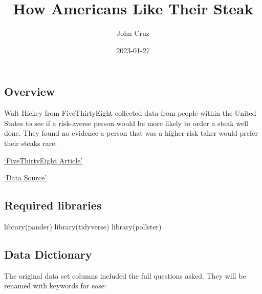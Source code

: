 \documentclass[
]{article}
\title{How Americans Like Their Steak}
\author{John Cruz}
\date{2023-01-27}
\newenvironment{Shaded}{\begin{snugshade}}{\end{snugshade}}
\newcommand{\FunctionTok}[1]{\textcolor[rgb]{0.00,0.00,0.00}{#1}}
\newcommand{\NormalTok}[1]{#1}
\begin{document}
\maketitle

\hypertarget{overview}{%
\subsection{Overview}\label{overview}}

Walt Hickey from FiveThirtyEight collected data from people within the
United States to see if a risk-averse person would be more likely to
order a steak well done. They found no evidence a person that was a
higher risk taker would prefer their steaks rare.

\href{\textquotesingle{}https://fivethirtyeight.com/features/how-americans-like-their-steak/\textquotesingle{}}{`FiveThirtyEight
Article'}

\href{\textquotesingle{}https://raw.githubusercontent.com/fivethirtyeight/data/master/steak-survey/steak-risk-survey.csv\textquotesingle{}}{`Data
Source'}

\hypertarget{required-libraries}{%
\subsection{Required libraries}\label{required-libraries}}

\begin{Shaded}
\begin{Highlighting}[]
\FunctionTok{library}\NormalTok{(pander)}
\FunctionTok{library}\NormalTok{(tidyverse)}
\FunctionTok{library}\NormalTok{(pollster)}
\end{Highlighting}
\end{Shaded}

\hypertarget{data-dictionary}{%
\subsection{Data Dictionary}\label{data-dictionary}}

The original data set columns included the full questions asked. They
will be renamed with keywords for ease:
\end{document}
